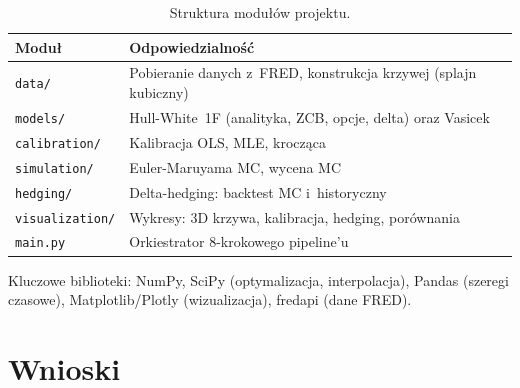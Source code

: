 \documentclass[12pt,a4paper]{article}
\begin{document}
\begin{table}[H]
  \centering
  \caption{Struktura modułów projektu.}
  \label{tab:modules}
  \begin{tabular}{@{}lp{8cm}@{}}
    \toprule
    \textbf{Moduł} & \textbf{Odpowiedzialność} \\
    \midrule
    \texttt{data/}         & Pobieranie danych z~FRED, konstrukcja
                             krzywej (splajn kubiczny) \\
    \texttt{models/}       & Hull-White~1F (analityka, ZCB, opcje,
                             delta) oraz Vasicek \\
    \texttt{calibration/}  & Kalibracja OLS, MLE, krocząca \\
    \texttt{simulation/}   & Euler-Maruyama MC, wycena MC \\
    \texttt{hedging/}      & Delta-hedging: backtest MC
                             i~historyczny \\
    \texttt{visualization/}& Wykresy: 3D krzywa, kalibracja,
                             hedging, porównania \\
    \texttt{main.py}       & Orkiestrator 8-krokowego pipeline'u \\
    \bottomrule
  \end{tabular}
\end{table}

Kluczowe biblioteki: NumPy, SciPy (optymalizacja, interpolacja),
Pandas (szeregi czasowe), Matplotlib/Plotly (wizualizacja),
fredapi (dane FRED).

\section{Wnioski}
\label{sec:conclusions}
\end{document}
